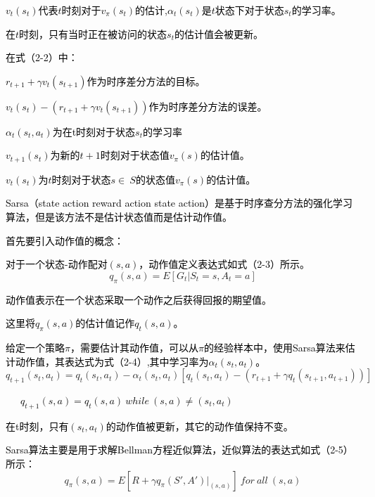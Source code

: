 \textcolor{black}{$v_{t}(s_{t})$代表$t$时刻对于$v_{\pi}(s_{t})$的估计,${\alpha_{t}(s_{t})}$是$t$状态下对于状态$s_{t}$的学习率。}

\textcolor{black}{在$t$时刻，只有当时正在被访问的状态$s_{t}$的估计值会被更新。}

\textcolor{black}{在式（2-2）中：}

\textcolor{black}{$r_{t+1}+\gamma v_{t}(s_{t+1})$作为时序差分方法的目标。}

\textcolor{black}{$v_{t}(s_{t})-(r_{t+1}+\gamma v_{t}(s_{t+1}))$作为时序差分方法的误差。}

\textcolor{black}{$\alpha_{t}(s_{t},a_{t})$为在{t}时刻对于状态$s_{t}$的学习率}

\textcolor{black}{$v_{t+1}(s_{t})$为新的$t+1$时刻对于状态值$v_{\pi}(s)$的估计值。}

\textcolor{black}{$v_{t}(s_{t})$为$t$时刻对于状态$s\in\ S$的状态值$v_{\pi}(s)$的估计值。}

\textcolor{black}{Sarsa（state action reward action state action）是基于时序查分方法的强化学习算法，但是该方法不是估计状态值而是估计动作值\cite{ref29}\cite{ref30}。}

\textcolor{black}{首先要引入动作值的概念：}

\textcolor{black}{对于一个状态-动作配对${(s,a)}$，动作值定义表达式如式（2-3）所示。}
\begin{equation}
q_{\pi}\left({s,a}\right)={E}\left[\left.{G}_{t}\right|{S}_{t}{=s,} {A}_{t}{=a} \right] 
\end{equation}

\textcolor{black}{动作值表示在一个状态采取一个动作之后获得回报的期望值。}

\textcolor{black}{这里将${q}_{\pi}\left({s,a}\right)$的估计值记作${q}_{t}\left({s,a}\right)$。}

\textcolor{black}{给定一个策略$\pi$，需要估计其动作值，可以从$\pi$的经验样本中，使用Sarsa算法来估计动作值，其表达式为式（2-4）,其中学习率为$\alpha _{t}(s_{t},a_{t})$。}
\begin{equation}
q_{t+1}(s_{t},a_{t})=q_{t}(s_{t},a_{t})-\alpha _{t}(s_{t},a_{t})[q_{t}(s_{t},a_{t})-(r_{t+1}+\gamma q_{t}(s_{t+1},a_{t+1}))]    
\end{equation}

\textcolor{black}{\ \ \ $q_{t+1}(s,a)=q_{t}(s,a) \ while \ (s,a) \neq (s_{t},a_{t})$}

\textcolor{black}{在t时刻，只有$\left({s}_{t}{,} {a}_{t}\right)$的动作值被更新，其它的动作值保持不变。}

\textcolor{black}{Sarsa算法主要是用于求解Bellman方程近似算法，近似算法的表达式如式（2-5）所示：}
\begin{equation}
{q}_{\pi}({s,a}){=E}[R+\gamma q_{\pi}(S',A')|_{(s,a)}] \ for \ all \ (s,a) 
\end{equation}

